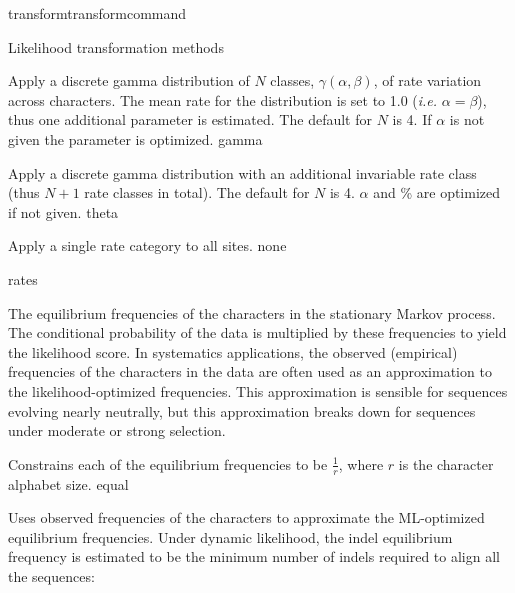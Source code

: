 \begin{command}{transform}{transformcommand}
\begin{arguments}
\begin{argumentgroup}{Likelihood transformation methods}
{\begin{description}
                        {Apply a discrete gamma distribution of $N$ classes,
                        $\gamma(\alpha,\beta)$, of rate variation across
                        characters. The mean rate for the distribution is set to
                        1.0 (\emph{i.e.} $\alpha = \beta$), thus one additional parameter is
                        estimated. The default for $N$ is 4. If $\alpha$ is
                        not given the parameter is optimized.}
                        {gamma}

                        {Apply a discrete gamma distribution with an additional
                        invariable rate class (thus $N+1$ rate classes in total).
                        The default for $N$ is 4. $\alpha$ and \% are optimized if
                        not given.}
                        {theta}

                        {Apply a single rate category to all sites.}
                        {none}

                \end{description}}
                {rates}

                    {The equilibrium frequencies of the characters in the stationary
                    Markov process. The conditional probability of the data is
                    multiplied by these frequencies to yield the likelihood score.
                    In systematics applications, the observed (empirical)
                    frequencies of the characters in the data are often used as an
                    approximation to the likelihood-optimized frequencies. This
                    approximation is sensible for sequences evolving nearly
                    neutrally, but this approximation breaks down for sequences
                    under moderate or strong selection.

                    \begin{description}

                            {Constrains each of the equilibrium frequencies to be
                            $\frac{1}{r}$, where $r$ is the character alphabet size.}
                            {equal}

                            {Uses observed frequencies of the characters to
                            approximate the ML-optimized equilibrium
                            frequencies.  Under dynamic likelihood, the indel
                            equilibrium frequency is estimated to be the minimum
                            number of indels required to align all the
                            sequences: 
                            
}
\end{description}}
\end{argumentgroup}
\end{arguments}
\end{command}
